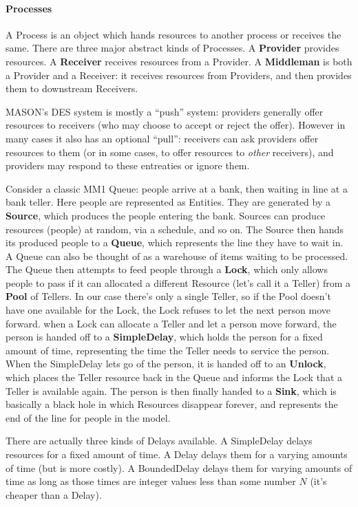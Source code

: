 \documentclass[twoside,10pt]{article}
\begin{document}
\paragraph{Processes}  A Process is an object which hands resources to another process or receives the same.  There are three major abstract kinds of Processes.  A {\bf Provider} provides resources.  A {\bf Receiver} receives resources from a Provider.  A {\bf Middleman} is both a Provider and a Receiver: it receives resources from Providers, and then provides them to downstream Receivers.

MASON's DES system is mostly a ``push'' system: providers generally offer resources to receivers (who may choose to accept or reject the offer).  However in many cases it also has an optional ``pull'':  receivers can ask providers offer resources to them (or in some cases, to offer resources to {\it other} receivers), and providers may respond to these entreaties or ignore them.

Consider a classic MM1 Queue: people arrive at a bank, then waiting in line at a bank teller.  Here people are represented as Entities.  They are generated by a {\bf Source}, which produces the people entering the bank.  Sources can produce resources (people) at random, via a schedule, and so on.  The Source then hands its produced people to a {\bf Queue}, which represents the line they have to wait in.  A Queue can also be thought of as a warehouse of items waiting to be processed.  The Queue then attempts to feed people through a {\bf Lock}, which only allows people to pass if it can allocated a different Resource (let's call it a Teller) from a {\bf Pool} of Tellers.  In our case there's only a single Teller, so if the Pool doesn't have one available for the Lock, the Lock refuses to let the next person move forward.  when a Lock can allocate a Teller and let a person move forward, the person is handed off to a {\bf SimpleDelay}, which holds the person for a fixed amount of time, representing the time the Teller needs to service the person.  When the SimpleDelay lets go of the person, it is handed off to an {\bf Unlock}, which places the Teller resource back in the Queue and informs the Lock that a Teller is available again.  The person is then finally handed to a {\bf Sink}, which is basically a black hole in which Resources disappear forever, and represents the end of the line for people in the model.

There are actually three kinds of Delays available.  A SimpleDelay delays resources for a fixed amount of time.  A Delay delays them for a varying amounts of time (but is more costly).  A BoundedDelay delays them for varying amounts of time as long as those times are integer values less than some number \(N\) (it's cheaper than a Delay).
\end{document}
